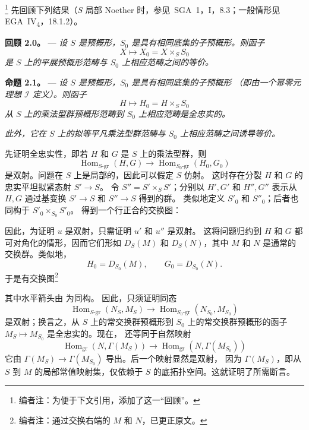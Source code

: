 \footnote{编者注：为便于下文引用，添加了这一“回顾”。}
先回顾下列结果（\(S\) 局部 Noether 时，参见\ SGA~1，I，8.3；一般情形见
EGA~IV\textsubscript{4}，18.1.2）。

\medskip
\noindent{}\textbf{回顾 2.0。} ---
\textit{设 \(S\) 是预概形，\(S_0\) 是具有相同底集的子预概形。则函子
\[
  X\longmapsto X_0=X\times_S S_0
\]
是 \(S\) 上的平展预概形范畴与 \(S_0\) 上相应范畴之间的等价。}

\medskip
\noindent{}%
\textbf{命题 2.1。} ---
\textit{设 \(S\) 是预概形，\(S_0\) 是具有相同底集的子预概形
（即由一个幂零元理想 \(\mathscr I\) 定义）。则函子
\[
  H\longmapsto H_0=H\times_S S_0
\]
从 \(S\) 上的乘法型群预概形范畴到 \(S_0\) 上相应范畴是全忠实的。}

\textit{此外，它在 \(S\) 上的拟等平凡乘法型群范畴与 \(S_0\) 上相应范畴之间诱导等价。}

先证明全忠实性，即若 \(H\) 和 \(G\) 是 \(S\) 上的乘法型群，则
\[
  \operatorname{Hom}_{S\text{-}\mathrm{gr}}(H,G)
  \longrightarrow
  \operatorname{Hom}_{S_0\text{-}\mathrm{gr}}(H_0,G_0)
\]
是双射。问题在 \(S\) 上是局部的，因此可以假定 \(S\) 仿射。
这时存在分裂 \(H\) 和 \(G\) 的忠实平坦拟紧态射 \(S'\to S\)。
令 \(S''=S'\times_S S'\)；分别以 \(H',G'\) 和 \(H'',G''\) 表示从
\(H,G\) 通过基变换 \(S'\to S\) 和 \(S''\to S\) 得到的群。
类似地定义 \(S'_0\) 和 \(S''_0\)；后者也同构于 \(S'_0\times_{S_0}S'_0\)。
得到一个行正合的交换图：
\begin{center}
  
\end{center}
因此，为证明 \(u\) 是双射，只需证明 \(u'\) 和 \(u''\) 是双射。
这将问题归约到 \(H\) 和 \(G\) 都可对角化的情形，因而它们形如 \(D_S(M)\) 和
\(D_S(N)\)，其中 \(M\) 和 \(N\) 是通常的交换群。类似地，
\[
  H_0=D_{S_0}(M),\qquad G_0=D_{S_0}(N).
\]
于是有交换图\footnote{编者注：通过交换右端的 \(M\) 和 \(N\)，已更正原文。}
\begin{center}
  
\end{center}
其中水平箭头由  为同构。
因此，只须证明同态
\begin{equation}
  \operatorname{Hom}_{S\text{-}\mathrm{gr}}(N_S,M_S)
  \longrightarrow
  \operatorname{Hom}_{S_0\text{-}\mathrm{gr}}(N_{S_0},M_{S_0})
  \tag{x}\label{sga3:x:proposition:2-1:equation:x}
\end{equation}
是双射；换言之，从 \(S\) 上的常交换群预概形到 \(S_0\) 上的常交换群预概形的函子
\(M_S\mapsto M_{S_0}\) 是全忠实的。现在，
 还等同于自然映射
\[
  \operatorname{Hom}_{\mathrm{gr}}(N,\Gamma(M_S))
  \longrightarrow
  \operatorname{Hom}_{\mathrm{gr}}(N,\Gamma(M_{S_0}))
\]
它由 \(\Gamma(M_S)\to\Gamma(M_{S_0})\) 导出。后一个映射显然是双射，
因为 \(\Gamma(M_S)\)，即从 \(S\) 到 \(M\) 的局部常值映射集，仅依赖于
\(S\) 的底拓扑空间。这就证明了所需断言。

